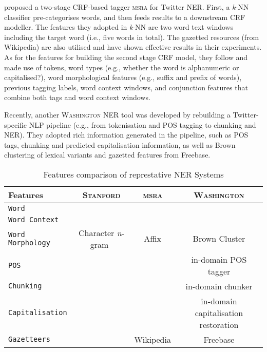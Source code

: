 \documentclass[11pt]{article}
\newcommand{\eg}{e.g.,\xspace}
\newcommand{\ie}{i.e.,\xspace}
\newcommand{\ngram}{\textit{n}-gram\ }
\newcommand{\stanford}{\textsc{Stanford}\xspace}
\newcommand{\washington}{\textsc{Washington}\xspace}
\newcommand{\msra}{\textsc{msra}\xspace}
\newcommand{\feature}[1]{\texttt{#1}\xspace}
\newcommand{\cmark}{\ding{51}}%
\newcommand{\xmark}{\ding{55}}%
\begin{document}
 proposed a two-stage CRF-based tagger \msra for Twitter NER.
First, a \textit{k}-NN classifier pre-categorises words, and then feeds results to a downstream CRF modeller.
The features they adopted in \textit{k}-NN are two word text windows including the target word (\ie five words in total).
The gazetted resources (from Wikipedia) are also utilised and have shown effective results in their experiments.
As for the features for building the second stage CRF model, they follow  and made use of tokens, word types (\eg whether the word is alphanumeric or capitalised?), word morphological features (\eg suffix and prefix of words), previous tagging labels, word context windows, and conjunction features that combine both tags and word context windows.

Recently, another \washington NER tool was developed by rebuilding a Twitter-specific NLP pipeline (\eg from tokenisation and POS tagging to chunking and NER).
They adopted rich information generated in the pipeline, such as POS tags, chunking and predicted capitalisation information, as well as Brown clustering of lexical variants and gazetted features from Freebase.

\begin{table*}[!htbp]
\begin{center}
\begin{tabular}{lccc}
\hline 
Features                                     & \stanford & \msra & \washington \\ 
\hline
\feature{Word}                               & \cmark & \cmark & \cmark \\
\feature{Word Context}                       & \cmark & \cmark & \cmark \\
\feature{Word Morphology}                    & Character \ngram  & Affix & Brown Cluster \\
\feature{POS}                                & \cmark & \xmark & in-domain POS tagger\\
\feature{Chunking}                           & \xmark & \xmark & in-domain chunker \\
\feature{Capitalisation}                     & \xmark & \cmark & in-domain capitalisation restoration\\
\feature{Gazetteers}                         & \xmark & Wikipedia & Freebase \\
\hline
\end{tabular}
\end{center}
\caption{Features comparison of represtative NER Systems}
\label{tab:fea_comp}
\end{table*}
\end{document}
